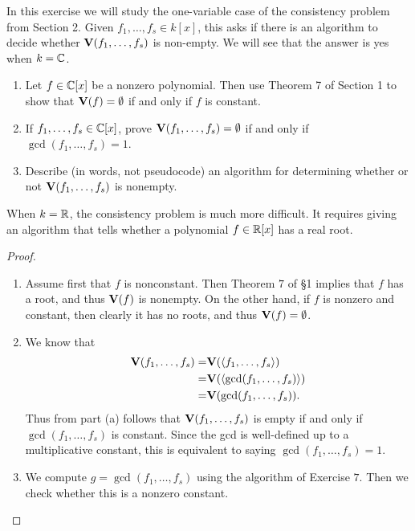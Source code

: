 \begin{exercise}{11}
In this exercise we will study the one-variable case of the consistency problem from Section 2. 
Given $f_1,\dots,f_s\in k[x]$, this asks if there is an algorithm to decide whether $\mathbf{V}(f_1,\dots,f_s)$ is non-empty. 
We will see that the answer is yes when $k=\mathbb{C}$.
\begin{enumerate}
    \item Let $f\in\mathbb{C}[x]$ be a nonzero polynomial. 
    Then use Theorem 7 of Section 1 to show that $\mathbf{V}(f) =\emptyset$ if and only if $f$ is constant.
    \item If $f_1,\dots,f_s\in\mathbb{C}[x]$, prove $\mathbf{V}(f_1,\dots,f_s) =\emptyset$ if and only if $\gcd(f_1,\dots,f_s) =1$.
    \item Describe (in words, not pseudocode) an algorithm for determining whether or not $\mathbf{V}(f_1,\dots,f_s)$ is nonempty.
\end{enumerate}
When $k=\mathbb{R}$, the consistency problem is much more difficult. 
It requires giving an algorithm that tells whether a polynomial $f\in\mathbb{R}[x]$ has a real root.
\end{exercise}
\begin{proof}
\begin{enumerate}
    \item Assume first that $f$ is nonconstant. 
    Then Theorem $7$ of \S 1 implies that $f$ has a root, and thus $\mathbf{V}(f)$ is nonempty. 
    On the other hand, if $f$ is nonzero and constant, then clearly it has no roots, and thus $\mathbf{V}(f) = \emptyset$.
    \item We know that
    \begin{align*}
        \mathbf{V}(f_1,\dots,f_s)
        =& \mathbf{V}(\langle f_1,\dots,f_s\rangle)\\
        =& \mathbf{V}(\langle \gcd(f_1,\dots,f_s)\rangle)\\
        =& \mathbf{V}(\gcd(f_1,\dots,f_s)).
    \end{align*}
    Thus from part (a) follows that $\mathbf{V}(f_1,\dots,f_s)$ is empty if and only if $\gcd(f_1,\dots,f_s)$ is constant. 
    Since the gcd is well-defined up to a multiplicative constant, this is equivalent to saying $\gcd(f_1,\dots,f_s) = 1$.
    \item We compute $g = \gcd(f_1,\dots,f_s)$ using the algorithm of Exercise $7$. 
    Then we check whether this is a nonzero constant.
\end{enumerate}
\end{proof}

